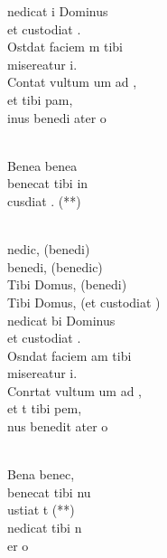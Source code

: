 \begin{cancion}[Benedicat][]%
	nedicat i Dominus \\
	et custodiat .\\
	Ostdat faciem m tibi\\
	 misereatur i.\\
	Contat vultum um ad ,\\
	et  tibi pam,\\
	inus benedi ater o \\\jump\\
	\begin{chorus}%
	Benea benea \\
	benecat tibi in\\
	 cusdiat . (**)\\
	\end{chorus}%
	\jump\\
	nedic, (benedi)\\
	benedi, (benedic)\\
	Tibi Domus, (benedi)\\
	Tibi Domus, (et custodiat )\\
\jump
	nedicat bi Dominus\\
	et custodiat .\\
	Osndat faciem am tibi\\
	 misereatur i.\\
	Conrtat vultum um ad ,\\
	et t tibi pem,\\
	nus benedit ater o \\\jump\\
	\begin{chorus}%
	Bena benec,\\
	benecat tibi nu\\
	ustiat t (**)\\
\jump
	nedicat tibi n\\
	er o \\
	\end{chorus}%
	\jump\\
\end{cancion}%
